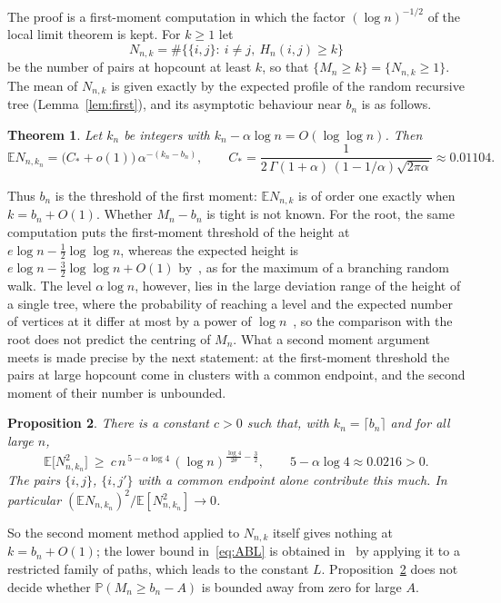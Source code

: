 \documentclass[11pt]{amsart}
\newtheorem{theorem}{Theorem}
\newtheorem{proposition}[theorem]{Proposition}
\theoremstyle{definition}
\newcommand{\Prob}{\mathbb{P}}
\newcommand{\E}{\mathbb{E}}
\newcommand{\as}{\alpha}
\begin{document}
The proof is a first-moment computation in which the factor $(\log n)^{-1/2}$ of the local limit theorem is kept. For
$k\ge1$ let
\[
N_{n,k}=\#\bigl\{\{i,j\}:\ i\ne j,\ H_n(i,j)\ge k\bigr\}
\]
be the number of pairs at hopcount at least $k$, so that $\{M_n\ge k\}=\{N_{n,k}\ge1\}$. The mean of $N_{n,k}$ is
given exactly by the expected profile of the random recursive tree (Lemma~\ref{lem:first}), and its asymptotic
behaviour near $b_n$ is as follows.

\begin{theorem}\label{thm:first}
Let $k_n$ be integers with $k_n-\as\log n=O(\log\log n)$. Then
\[
\E N_{n,k_n}=\bigl(C_*+o(1)\bigr)\,\as^{-(k_n-b_n)},\qquad
C_*=\frac{1}{2\,\Gamma(1+\as)\,(1-1/\as)\sqrt{2\pi\as}}\approx0.01104 .
\]
\end{theorem}

Thus $b_n$ is the threshold of the first moment: $\E N_{n,k}$ is of order one exactly when $k=b_n+O(1)$. Whether
$M_n-b_n$ is tight is not known. For the root, the same computation puts the first-moment threshold of the height at
$e\log n-\frac12\log\log n$, whereas the expected height is $e\log n-\frac32\log\log n+O(1)$ by~\cite{ABF}, as for the maximum
of a branching random walk. The level $\as\log n$, however, lies in the large deviation range of the height of a
single tree, where the probability of reaching a level and the expected number of vertices at it differ at most by a
power of $\log n$~\cite{ChenMa}, so the comparison with the root does not predict the centring of $M_n$. What a
second moment argument meets is made precise by the next statement: at the first-moment threshold the pairs at large
hopcount come in clusters with a common endpoint, and the second moment of their number is unbounded.

\begin{proposition}\label{prop:second}
There is a constant $c>0$ such that, with $k_n=\lceil b_n\rceil$ and for all large $n$,
\[
\E\bigl[N_{n,k_n}^2\bigr]\ \ge\ c\,n^{\,5-\as\log4}\,(\log n)^{\frac{\log 4}{2\theta}-\frac32},
\qquad 5-\as\log4\approx0.0216>0 .
\]
The pairs $\{i,j\}$, $\{i,j'\}$ with a common endpoint alone contribute this much. In particular
$(\E N_{n,k_n})^2/\E[N_{n,k_n}^2]\to0$.
\end{proposition}

So the second moment method applied to $N_{n,k}$ itself gives nothing at $k=b_n+O(1)$; the lower bound
in~\eqref{eq:ABL} is obtained in~\cite{ABL} by applying it to a restricted family of paths, which leads to the
constant $L$. Proposition~\ref{prop:second} does not decide whether $\Prob(M_n\ge b_n-A)$ is bounded away from zero for
large $A$.
\end{document}
